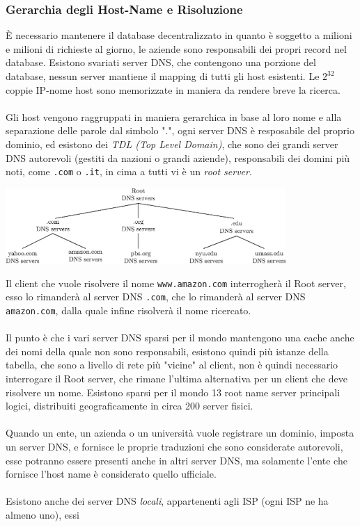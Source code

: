 \documentclass[12pt, letterpaper]{article}
\newcommand{\code}[1]{\colorbox{light-gray}{\texttt{#1}}}
\newcommand{\acc}{\\\hphantom{}\\}
\begin{document}
\subsubsection{Gerarchia degli Host-Name e Risoluzione}
È necessario mantenere il database decentralizzato in quanto è soggetto a milioni e milioni di richieste
al giorno, le aziende sono responsabili dei propri record nel database. Esistono svariati server DNS, che contengono una
porzione del database, nessun server mantiene il mapping di tutti gli host esistenti. Le $2^{32}$ coppie
IP-nome host sono memorizzate in maniera da rendere breve la ricerca. \acc
Gli host vengono raggruppati in maniera gerarchica in base al loro nome e alla separazione delle parole
dal simbolo ".", ogni server DNS è resposabile del proprio dominio, ed esistono dei \textit{TDL (Top Level Domain)},
che sono dei grandi server DNS autorevoli (gestiti da nazioni o grandi aziende), responsabili dei domini più noti, come \code{.com} o \code{.it}, in
cima a tutti vi è un \textit{root server}.\begin{center}
    \includegraphics[width=0.8\textwidth ]{images/DNS.eps}
\end{center}
Il client che vuole risolvere il nome \code{www.amazon.com} interrogherà il Root server, esso
lo rimanderà al server DNS \code{.com}, che lo rimanderà al server DNS \code{amazon.com}, dalla quale infine
risolverà il nome ricercato.\acc
Il punto è che i vari server DNS sparsi per il mondo mantengono una cache anche dei nomi della quale non sono
responsabili, esistono quindi più istanze della tabella, che sono a livello di rete più "vicine" al client, non è
quindi necessario interrogare il Root server, che rimane l'ultima alternativa per un client che deve
risolvere un nome. Esistono sparsi per il mondo 13 root name server principali logici, distribuiti
geograficamente in circa 200 server fisici.\acc
Quando un ente, un azienda o un università vuole registrare un dominio, imposta un server DNS, e fornisce
le proprie traduzioni che sono considerate autorevoli, esse potranno essere presenti anche in altri server
DNS, ma solamente l'ente che fornisce l'host name è considerato quello ufficiale.\acc
Esistono anche dei server DNS \textit{locali}, appartenenti agli ISP (ogni ISP ne ha almeno uno), essi
\end{document}
